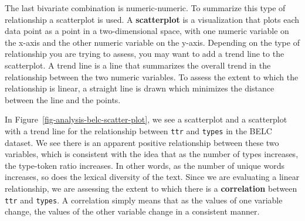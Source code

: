 \documentclass[
  letterpaper,
  krantz1]{latex/krantz-mod}
\theoremstyle{definition}
\theoremstyle{definition}
\theoremstyle{remark}
\begin{document}
The last bivariate combination is
numeric-numeric. To summarize this type of
relationship a scatterplot is used. A
\textbf{scatterplot} is a visualization that plots
each data point as a point in a two-dimensional space, with one numeric
variable on the x-axis and the other numeric variable on the y-axis.
Depending on the type of relationship you are trying to assess, you may
want to add a trend line to the scatterplot. A trend line is a line that
summarizes the overall trend in the relationship between the two numeric
variables. To assess the extent to which the relationship is linear, a
straight line is drawn which minimizes the distance between the line and
the points.

In Figure~\ref{fig-analysis-belc-scatter-plot}, we see a scatterplot and
a scatterplot with a trend line for the relationship between
\texttt{ttr} and \texttt{types} in the BELC dataset. We see there is an
apparent positive relationship between these two variables, which is
consistent with the idea that as the number of types increases, the
type-token ratio increases. In other
words, as the number of unique words increases, so does the lexical
diversity of the text. Since we are evaluating a linear relationship, we
are assessing the extent to which there is a
\textbf{correlation} between \texttt{ttr} and
\texttt{types}. A correlation simply means that as the values of one
variable change, the values of the other variable change in a consistent
manner.
\end{document}
